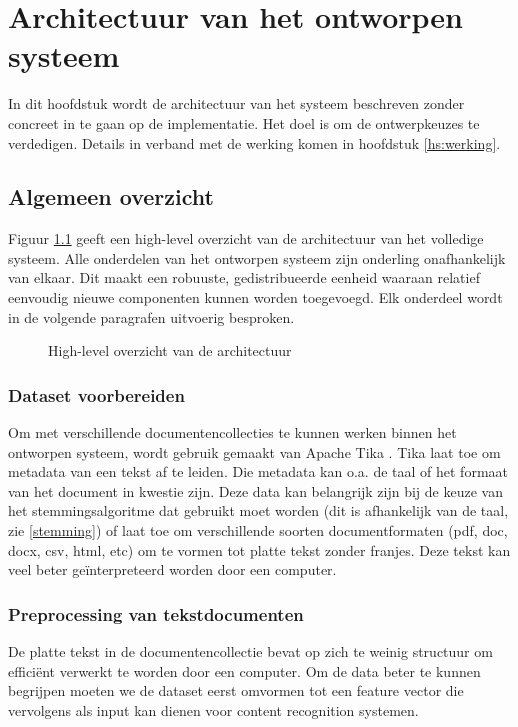 \chapter{Architectuur van het ontworpen systeem}

In dit hoofdstuk wordt de architectuur van het systeem beschreven zonder concreet in
te gaan op de implementatie. Het doel is om de ontwerpkeuzes te verdedigen. Details in verband met de werking komen in hoofdstuk \ref{hs:werking}. 

\section{Algemeen overzicht}

Figuur \ref{fig:overzicht-architectuur} geeft een high-level overzicht van de architectuur van het volledige systeem. Alle onderdelen van het ontworpen systeem zijn onderling onafhankelijk van elkaar. Dit maakt een robuuste, gedistribueerde eenheid waaraan relatief eenvoudig nieuwe componenten kunnen worden toegevoegd. Elk onderdeel wordt in de volgende paragrafen uitvoerig besproken.

\begin{figure}[h]
	\caption{High-level overzicht van de architectuur}
	\label{fig:overzicht-architectuur}
\end{figure}

\subsection{Dataset voorbereiden}
Om met verschillende documentencollecties te kunnen werken binnen het ontworpen systeem, wordt gebruik gemaakt van Apache Tika \cite{tika}. Tika laat toe om metadata van een tekst af te leiden. Die metadata kan o.a. de taal of het formaat van het document in kwestie zijn. Deze data kan belangrijk zijn bij de keuze van het stemmingsalgoritme dat gebruikt moet worden (dit is afhankelijk van de taal, zie \ref{stemming}) of laat toe om verschillende soorten documentformaten (pdf, doc, docx, csv, html, etc) om te vormen tot platte tekst zonder franjes. Deze tekst kan veel beter ge\"interpreteerd worden door een computer.

\subsection{Preprocessing van tekstdocumenten}\label{bag-of-words}
De platte tekst in de documentencollectie bevat op zich te weinig structuur om effici\"ent verwerkt te worden door een computer. Om de data beter te kunnen begrijpen moeten we de dataset eerst omvormen tot een feature vector die vervolgens als input kan dienen voor content recognition systemen.

